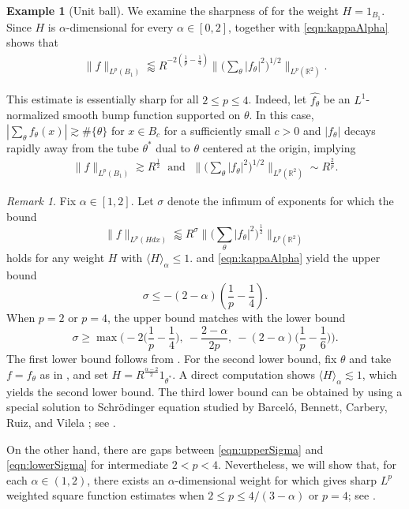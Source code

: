 \documentclass[11pt]{amsart}
\theoremstyle{definition}
\newtheorem{ex}{Example}
\theoremstyle{remark}
\newtheorem{remark}[theorem]{Remark}
\renewcommand{\hat}{\widehat}
\newcommand{\R}{\mathbb{R}}
\newcommand{\les}{\lesssim}
\newcommand{\less}{\lessapprox}
\newcommand{\inn}[1]{\langle  #1 \rangle}
\begin{document}
\begin{ex}[Unit ball]\label{ex_ball}
We examine the sharpness of  for the weight $H=1_{B_1}$.
Since $H$ is $\alpha$-dimensional for every $\alpha\in [0,2]$,  together with \eqref{eqn:kappaAlpha} shows that
\begin{align*}
\| f\|_{L^p(B_1)} \less R^{-2(\frac 1 p-\frac 1 4)}  \big\| \big(\sum_\theta |f_\theta|^2 \big)^{1/2}\big\|_{L^p(\R^2)}.
\end{align*}

This estimate is essentially sharp for all $2\leq p \leq 4$. Indeed, let $\hat{f_\theta}$ be an $L^1$-normalized smooth bump function supported on $\theta$. In this case,
$|\sum_\theta f_\theta(x)| \gtrsim \# \{ \theta\}$ for $x\in B_c$ for a sufficiently small $c>0$ and $|f_\theta|$ decays rapidly away from the tube $\theta^*$ dual to $\theta$ centered at the origin, implying
\begin{align*} 
\|f\|_{L^p(B_1)} \gtrsim R^{\frac 1 2}  \; \text{ and } \; 
\big\| \big(\sum_\theta |f_\theta|^2 \big)^{1/2}\big\|_{L^p(\R^2)} \sim R^{\frac2 p}.
\end{align*}
\end{ex}


\begin{remark}\label{remark:lowerBoundSquare}
Fix $\alpha\in [1,2]$. Let $\sigma$ denote the infimum of exponents for which the bound
\[ 
\|f\|_{L^p(Hdx)} \less R^\sigma \big\| \big(\sum_\theta |f_\theta|^2 \big)^{\frac12} \big\|_{L^p(\R^2)}
\]
holds for any weight $H$ with $\langle H\rangle_\alpha\le1$.   and \eqref{eqn:kappaAlpha}  yield the upper bound 
\begin{equation}\label{eqn:upperSigma}
    \sigma \le -(2-\alpha)\left(\frac{1}{p}-\frac{1}{4}\right).
\end{equation}
When $p=2$ or $p=4$, the upper bound matches with the lower bound  
\begin{equation}\label{eqn:lowerSigma}
   \sigma \ge \max\Big(-2\big(\frac1p-\frac14\big),~-\frac{2-\alpha}{2p},~-(2-\alpha)\big(\frac{1}{p}-\frac{1}{6}\big) \Big).  
\end{equation}
The first lower bound follows from . For the second lower bound, fix $\theta$ and take $f=f_\theta$ as in , and set $H=R^{\frac{\alpha-2}2} 1_{\theta^*}$. A direct computation shows $\inn{H}_{\alpha}\les 1$, which yields the second lower bound. The third lower bound can be obtained by using a special solution to Schr\"odinger equation studied by Barcel\'o, Bennett, Carbery, Ruiz, and Vilela \cite{BBCRV0}; see .

On the other hand, there are gaps between \eqref{eqn:upperSigma} and \eqref{eqn:lowerSigma} for intermediate $2<p<4$. Nevertheless, we will show that, for each $\alpha \in (1,2)$, there exists an $\alpha$-dimensional weight for which  gives sharp $L^p$ weighted square function estimates when $2\leq p\leq 4/(3-\alpha)$ or $p=4$; see . 
\end{remark}
\end{document}
